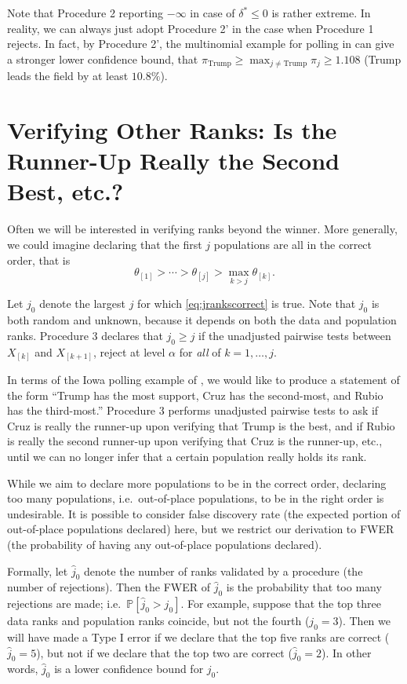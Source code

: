 \documentclass[11pt]{article}
\theoremstyle{definition}
\theoremstyle{custom}
\newcommand{\PP}{\mathbb{P}}
\begin{document}
Note that Procedure 2 reporting $-\infty$ in case of $\delta^* \le 0$ is rather extreme. In reality, we can always just adopt Procedure 2' in the case when Procedure 1 rejects. In fact, by Procedure 2', the multinomial example for polling in  can give a stronger lower confidence bound, that $\pi_{\text{Trump}} \ge \max_{j \ne \text{Trump}} \pi_{j} \ge 1.108$ (Trump leads the field by at least $10.8\%$).

\section{Verifying Other Ranks: Is the Runner-Up Really the Second Best, etc.?}
\label{sec:stepdown}

Often we will be interested in verifying ranks beyond the winner. More generally, we could imagine declaring that the first $j$ populations are all in the correct order, that is
\begin{equation}
\theta_{[1]} > \cdots > \theta_{[j]} > \max_{k>j} \theta_{[k]}.
\label{eq:jrankscorrect}
\end{equation}

Let $j_0$ denote the largest $j$ for which \eqref{eq:jrankscorrect} is true. Note that $j_0$ is both random and unknown, because it depends on both the data and population ranks. Procedure 3 declares that $j_0 \ge j$ if the unadjusted pairwise tests between $X_{[k]}$ and $X_{[k+1]}$, reject at level $\alpha$ for {\em all} of $k = 1, \ldots, j$.

In terms of the Iowa polling example of , we would like to produce a statement of the form ``Trump has the most support, Cruz has the second-most, and Rubio has the third-most.'' Procedure 3 performs unadjusted pairwise tests to ask if Cruz is really the runner-up upon verifying that Trump is the best, and if Rubio is really the second runner-up upon verifying that Cruz is the runner-up, etc., until we can no longer infer that a certain population really holds its rank.

While we aim to declare more populations to be in the correct order, declaring too many populations, i.e.\ out-of-place populations, to be in the right order is undesirable. It is possible to consider false discovery rate (the expected portion of out-of-place populations declared) here, but we restrict our derivation to FWER (the probability of having any out-of-place populations declared).

Formally, let $\hat{j}_0$ denote the number of ranks validated by a procedure (the number of rejections). Then the FWER of $\hat{j}_0$ is the probability that too many rejections are made; i.e.\ $\PP\left[\hat{j}_0 > j_0\right]$. For example, suppose that the top three data ranks and population ranks coincide, but not the fourth ($j_0 = 3$). Then we will have made a Type I error if we declare that the top five ranks are correct ($\hat{j}_0 = 5$), but not if we declare that the top two are correct ($\hat{j}_0 = 2$). In other words, $\hat{j}_0$ is a lower confidence bound for $j_0$.
\end{document}
